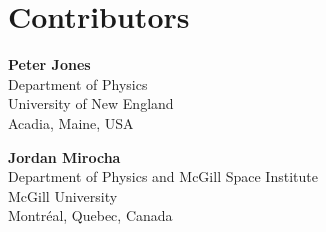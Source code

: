 
\chapter*{Contributors}
 


{\parskip=12pt

\noindent\textbf{Peter Jones}\\
Department of Physics\\
University of New England\\
Acadia, Maine, USA

\noindent\textbf{Jordan Mirocha}\\
Department of Physics and McGill Space Institute\\
McGill University \\
Montr\'eal, Quebec, Canada

}